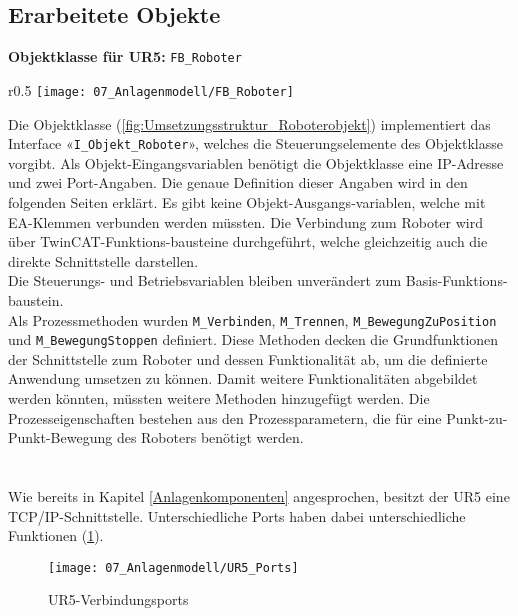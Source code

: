 		\newpage
		
	\subsection{Erarbeitete Objekte} \label{Objekt_Erarbeitet}
	
		\textbf{Objektklasse für UR5:} \verb|FB_Roboter|
		\vspace{2mm}
		\vspace{-10mm}  
		\\
		\begin{wrapfigure}{r}{0.5\textwidth}
			\centering
			\texttt{[image: 07\_Anlagenmodell/FB\_Roboter]}
			\captionsetup{justification=centering}
			\caption{Umsetzungsstruktur von Roboter-Objekt}
			\label{fig:Umsetzungsstruktur_Roboterobjekt}
		\end{wrapfigure} \par
		Die Objektklasse (\ref{fig:Umsetzungsstruktur_Roboterobjekt}) implementiert das Interface «\verb|I_Objekt_Roboter|», welches die Steuerungselemente des Objektklasse vorgibt. Als Objekt-Eingangsvariablen benötigt die Objektklasse eine IP-Adresse und zwei Port-Angaben. Die genaue Definition dieser Angaben wird in den folgenden Seiten erklärt. Es gibt keine Objekt-Ausgangs-variablen, welche mit EA-Klemmen verbunden werden müssten. Die Verbindung zum Roboter wird über TwinCAT-Funktions-bausteine durchgeführt, welche gleichzeitig auch die direkte Schnittstelle darstellen.
		\\
		Die Steuerungs- und Betriebsvariablen bleiben unverändert zum Basis-Funktions-baustein. 
		\\
		Als Prozessmethoden wurden \verb|M_Verbinden|, \verb|M_Trennen|, \verb|M_BewegungZuPosition| und \verb|M_BewegungStoppen| definiert. Diese Methoden decken die Grundfunktionen der Schnittstelle zum Roboter und dessen Funktionalität ab, um die definierte Anwendung umsetzen zu können. Damit weitere Funktionalitäten abgebildet werden könnten, müssten weitere Methoden hinzugefügt werden. Die Prozesseigenschaften bestehen aus den Prozessparametern, die für eine Punkt-zu-Punkt-Bewegung des Roboters benötigt werden.
		\\
		\\
		\\
		Wie bereits in Kapitel \ref{Anlagenkomponenten} angesprochen, besitzt der UR5 eine TCP/IP-Schnittstelle. Unterschiedliche Ports haben dabei unterschiedliche Funktionen (\ref{fig:Verbindungsports}). 
		
		\begin{figure}[h!]
			\centering
			\texttt{[image: 07\_Anlagenmodell/UR5\_Ports]}
			\captionsetup{justification=centering}
			\caption{UR5-Verbindungsports}
			\label{fig:Verbindungsports}
		\end{figure}
		

